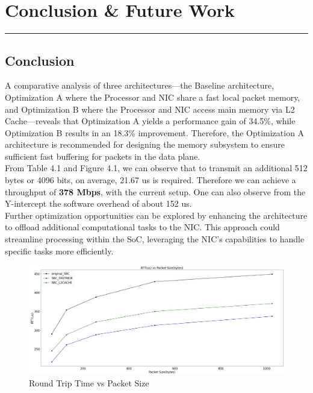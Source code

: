 \documentclass[12pt]{report}
\begin{document}
\newpage
\chapter{Conclusion \& Future Work} \label{4}
\rule[10pt]{\linewidth}{3pt}	

\section {Conclusion}
A comparative analysis of three architectures—the Baseline architecture, Optimization A where the Processor and NIC share a fast local packet memory, and Optimization B where the Processor and NIC access main memory via L2 Cache—reveals that Optimization A yields a performance gain of 34.5\%, while Optimization B results in an 18.3\% improvement. Therefore, the Optimization A architecture is recommended for designing the memory subsystem to ensure sufficient fast buffering for packets in the data plane. \\ 

From Table 4.1 and Figure 4.1, we can observe that to transmit an additional 512 bytes or 4096 bits, on average, 21.67 us is required. Therefore we can achieve a throughput of \textbf{378 Mbps}, with the current setup. One can also observe from the Y-intercept
the software overhead of about 152 us. \\

Further optimization opportunities can be explored by enhancing the architecture to offload additional computational tasks to the NIC. This approach could streamline processing within the SoC, leveraging the NIC's capabilities to handle specific tasks more efficiently.

\begin{figure}[h]
			\centering
			\includegraphics[width=16cm]{../figures/final123.jpg}
			\caption{Round Trip Time vs Packet Size}
			\label{fig:NIC-Proc-top-level4}
		\end{figure}
\end{document}
